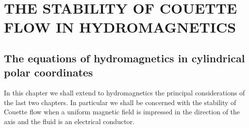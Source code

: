 \chapter{THE STABILITY OF COUETTE FLOW IN HYDROMAGNETICS}
\label{ch:9}

\section{The equations of hydromagnetics in cylindrical polar coordinates}
\label{sec:80}

In this chapter we shall extend to hydromagnetics the principal considerations of the last two chapters. In particular we shall be concerned with the stability of Couette flow when a uniform magnetic field is impressed in the direction of the axis and the fluid is an electrical conductor.

